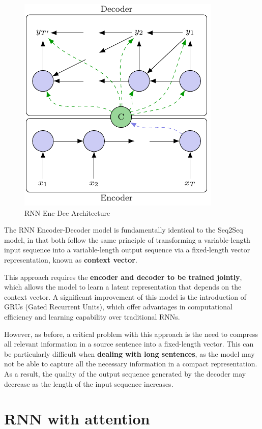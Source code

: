 \begin{figure}[!htbp]
    \centering
    \includegraphics[width=0.7\linewidth]{tikz/chapter7 - RNN Enc-Dec.pdf}
    \caption{RNN Enc-Dec Architecture}
\end{figure}

The RNN Encoder-Decoder model is fundamentally identical to the Seq2Seq model, in that both follow the same principle of transforming a variable-length input sequence into a variable-length output sequence via a fixed-length vector representation, known as \textbf{\textcolor{mygreen}{context vector}}. 

This approach requires the \textbf{encoder and decoder to be trained jointly}, which allows the model to learn a latent representation that depends on the context vector. A significant improvement of this model is the introduction of GRUs (Gated Recurrent Units), which offer advantages in computational efficiency and learning capability over traditional RNNs.

However, as before, a critical problem with this approach is the need to compress all relevant information in a source sentence into a fixed-length vector. This can be particularly difficult when \textbf{dealing with long sentences}, as the model may not be able to capture all the necessary information in a compact representation. As a result, the quality of the output sequence generated by the decoder may decrease as the length of the input sequence increases.

\section{RNN with attention}

